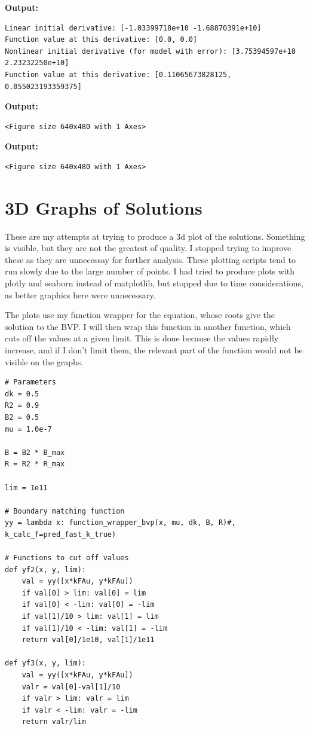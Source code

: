 \documentclass{article}
\begin{document}
\textbf{Output:}\begin{verbatim}
Linear initial derivative: [-1.03399718e+10 -1.68870391e+10]
Function value at this derivative: [0.0, 0.0]
Nonlinear initial derivative (for model with error): [3.75394597e+10 2.23232250e+10]
Function value at this derivative: [0.11065673828125, 0.055023193359375]

\end{verbatim}

\textbf{Output:}\begin{verbatim}
<Figure size 640x480 with 1 Axes>
\end{verbatim}

\textbf{Output:}\begin{verbatim}
<Figure size 640x480 with 1 Axes>
\end{verbatim}

\section{3D Graphs of Solutions}

These are my attempts at trying to produce a 3d plot of the solutions. Something is visible, but they are not the greatest of quality. I stopped trying to improve these as they are unnecessay for further analysis. These plotting scripts tend to run slowly due to the large number of points. I had tried to produce plots with plotly and seaborn instead of matplotlib, but stopped due to time considerations, as better graphics here were unnecessary.

The plots use my function wrapper for the equation, whose roots give the solution to the BVP. I will then wrap this function in another function, which cuts off the values at a given limit. This is done because the values rapidly increase, and if I don't limit them, the relevant part of the function would not be visible on the graphs.

\begin{lstlisting}
# Parameters
dk = 0.5
R2 = 0.9
B2 = 0.5
mu = 1.0e-7

B = B2 * B_max
R = R2 * R_max

lim = 1e11

# Boundary matching function
yy = lambda x: function_wrapper_bvp(x, mu, dk, B, R)#, k_calc_f=pred_fast_k_true)

# Functions to cut off values
def yf2(x, y, lim):
    val = yy([x*kFAu, y*kFAu])
    if val[0] > lim: val[0] = lim
    if val[0] < -lim: val[0] = -lim
    if val[1]/10 > lim: val[1] = lim
    if val[1]/10 < -lim: val[1] = -lim
    return val[0]/1e10, val[1]/1e11

def yf3(x, y, lim):
    val = yy([x*kFAu, y*kFAu])
    valr = val[0]-val[1]/10
    if valr > lim: valr = lim
    if valr < -lim: valr = -lim
    return valr/lim\end{lstlisting}
\end{document}
